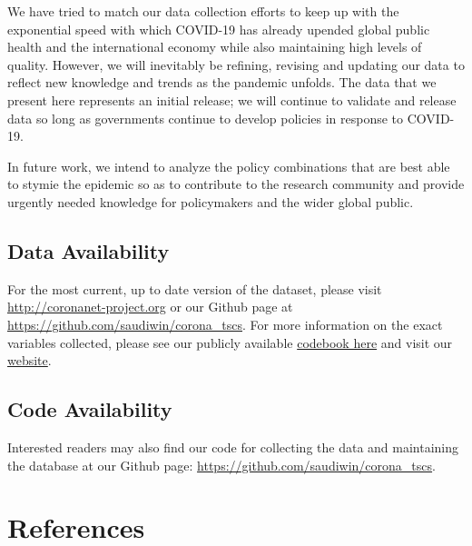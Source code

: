 \documentclass[]{article}
\begin{document}
We have tried to match our data collection efforts to keep up with the exponential speed with which COVID-19 has already upended global public health and the international economy while also maintaining high levels of quality. However, we will inevitably be refining, revising and updating our data to reflect new knowledge and trends as the pandemic unfolds. The data that we present here represents an initial release; we will continue to validate and release data so long as governments continue to develop policies in response to COVID-19.

In future work, we intend to analyze the policy combinations that are best able to stymie the epidemic so as to contribute to the research community and provide urgently needed knowledge for policymakers and the wider global public.

\newpage

\hypertarget{data-availability}{%
\subsection*{Data Availability}\label{data-availability}}

For the most current, up to date version of the dataset, please visit \url{http://coronanet-project.org} or our Github page at \url{https://github.com/saudiwin/corona_tscs}. For more information on the exact variables collected, please see our publicly available \href{https://docs.google.com/document/d/1zvNMpwj0onFvUZ_gLl4RRjqS-clbHv3TIX6EOHofsME/edit?usp=sharing}{codebook here} and visit our \href{https://coronanet-project.org/}{website}.

\hypertarget{code-availability}{%
\subsection*{Code Availability}\label{code-availability}}

Interested readers may also find our code for collecting the data and maintaining the database at our Github page: \url{https://github.com/saudiwin/corona_tscs}.

\newpage

\hypertarget{references}{%
\section*{References}\label{references}}
\end{document}
